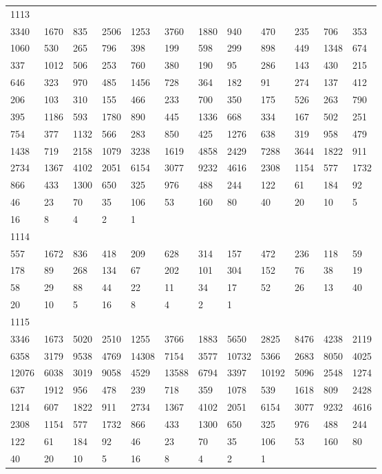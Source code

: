 \begin{longtable}{llllllllllll}
1113&&&&&&&&&&&\\
3340& 1670& 835& 2506& 1253& 3760& 1880& 940& 470& 235& 706& 353\\
1060& 530& 265& 796& 398& 199& 598& 299& 898& 449& 1348& 674\\
337& 1012& 506& 253& 760& 380& 190& 95& 286& 143& 430& 215\\
646& 323& 970& 485& 1456& 728& 364& 182& 91& 274& 137& 412\\
206& 103& 310& 155& 466& 233& 700& 350& 175& 526& 263& 790\\
395& 1186& 593& 1780& 890& 445& 1336& 668& 334& 167& 502& 251\\
754& 377& 1132& 566& 283& 850& 425& 1276& 638& 319& 958& 479\\
1438& 719& 2158& 1079& 3238& 1619& 4858& 2429& 7288& 3644& 1822& 911\\
2734& 1367& 4102& 2051& 6154& 3077& 9232& 4616& 2308& 1154& 577& 1732\\
866& 433& 1300& 650& 325& 976& 488& 244& 122& 61& 184& 92\\
46& 23& 70& 35& 106& 53& 160& 80& 40& 20& 10& 5\\
16& 8& 4& 2& 1& \\

1114&&&&&&&&&&&\\
557& 1672& 836& 418& 209& 628& 314& 157& 472& 236& 118& 59\\
178& 89& 268& 134& 67& 202& 101& 304& 152& 76& 38& 19\\
58& 29& 88& 44& 22& 11& 34& 17& 52& 26& 13& 40\\
20& 10& 5& 16& 8& 4& 2& 1& \\

1115&&&&&&&&&&&\\
3346& 1673& 5020& 2510& 1255& 3766& 1883& 5650& 2825& 8476& 4238& 2119\\
6358& 3179& 9538& 4769& 14308& 7154& 3577& 10732& 5366& 2683& 8050& 4025\\
12076& 6038& 3019& 9058& 4529& 13588& 6794& 3397& 10192& 5096& 2548& 1274\\
637& 1912& 956& 478& 239& 718& 359& 1078& 539& 1618& 809& 2428\\
1214& 607& 1822& 911& 2734& 1367& 4102& 2051& 6154& 3077& 9232& 4616\\
2308& 1154& 577& 1732& 866& 433& 1300& 650& 325& 976& 488& 244\\
122& 61& 184& 92& 46& 23& 70& 35& 106& 53& 160& 80\\
40& 20& 10& 5& 16& 8& 4& 2& 1& \\


\end{longtable}
